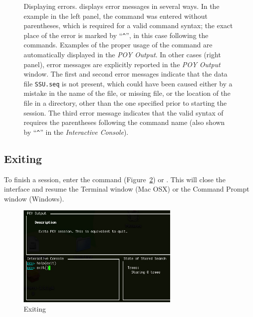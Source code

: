 {\begin{figure}
\begin{minipage}[c]{0.48\textwidth}
\end{minipage}
\caption{Displaying errors. \poy displays error messages in several
ways. In the example in the left panel, the command 
was entered without parentheses, which is required for a  valid
\poy command syntax; the exact place of the error is marked by
``\texttt{\^}'', in this case  following the 
commands. Examples of the proper usage of the command are automatically
displayed in the \emph{POY Output}.  In other cases (right panel),
error messages are explicitly reported in the \emph{POY Output}
window. The first and second error messages indicate that the data
file \texttt{SSU.seq} is not present, which could have been caused
either by a mistake in the name of the file, or missing file, or the
location of the file in a directory, other than the one specified
prior to starting the \poy session. The third error message indicates
that the valid syntax of  requires the parentheses
following the command name (also shown by ``\texttt{\^}'' in  the
\emph{Interactive Console}).} \label{fig:errors} \end{figure}

\subsection{Exiting} To finish a \poy session, enter the command
 (Figure~\ref{fig:exithelp}) or .
This will close the \poy interface and resume the Terminal window
(Mac OSX) or the Command Prompt window (Windows).

\begin{figure}[]
\begin{center}
\includegraphics[width=0.7\textwidth]{doc/figures/exithelp.jpg}
\end{center}
\caption{Exiting \poy}
\label{fig:exithelp}
\end{figure}

}
